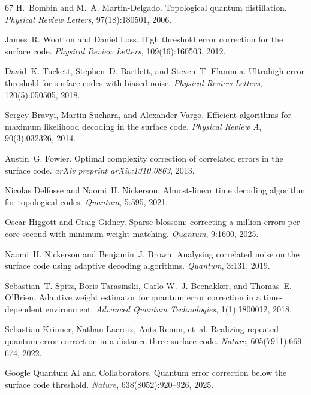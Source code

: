 \documentclass[aps,prxquantum,twocolumn,superscriptaddress,nofootinbib,longbibliography]{revtex4-2}
\begin{document}
\begin{thebibliography}{67}
H.~Bombin and M.~A. Martin-Delgado. Topological quantum distillation.
\emph{Physical Review Letters}, 97(18):180501, 2006.

James~R. Wootton and Daniel Loss. High threshold error correction for the
surface code. \emph{Physical Review Letters}, 109(16):160503, 2012.

David~K. Tuckett, Stephen~D. Bartlett, and Steven~T. Flammia. Ultrahigh error
threshold for surface codes with biased noise. \emph{Physical Review Letters},
120(5):050505, 2018.

Sergey Bravyi, Martin Suchara, and Alexander Vargo. Efficient algorithms for
maximum likelihood decoding in the surface code. \emph{Physical Review A},
90(3):032326, 2014.

Austin~G. Fowler. Optimal complexity correction of correlated errors in the
surface code. \emph{arXiv preprint arXiv:1310.0863}, 2013.

Nicolas Delfosse and Naomi~H. Nickerson. Almost-linear time decoding algorithm
for topological codes. \emph{Quantum}, 5:595, 2021.

Oscar Higgott and Craig Gidney. Sparse blossom: correcting a million errors
per core second with minimum-weight matching. \emph{Quantum}, 9:1600, 2025.

Naomi~H. Nickerson and Benjamin~J. Brown. Analysing correlated noise on the
surface code using adaptive decoding algorithms. \emph{Quantum}, 3:131, 2019.

Sebastian~T. Spitz, Boris Tarasinski, Carlo W.~J. Beenakker, and Thomas~E.
O'Brien. Adaptive weight estimator for quantum error correction in a
time-dependent environment. \emph{Advanced Quantum Technologies},
1(1):1800012, 2018.

Sebastian Krinner, Nathan Lacroix, Ants Remm, et~al. Realizing repeated quantum
error correction in a distance-three surface code. \emph{Nature},
605(7911):669--674, 2022.

{Google Quantum AI and Collaborators}. Quantum error correction below the
surface code threshold. \emph{Nature}, 638(8052):920--926, 2025.


\end{thebibliography}
\end{document}
